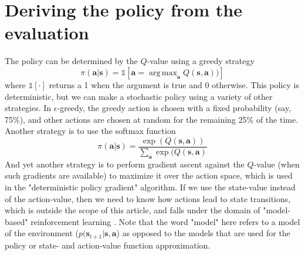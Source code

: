\documentclass{article}
\DeclareMathOperator*{\argmax}{arg\,max}
\begin{document}
\section{Deriving the policy from the evaluation}
The policy can be determined by the $Q$-value using a greedy strategy
\begin{equation}\label{eq:greedy_policy}
    \pi(\mathbf{a}|\mathbf{s})=\mathbb{1}\left[\mathbf{a}=\argmax_\mathbf{a}Q(\mathbf{s},\mathbf{a}))\right]
\end{equation}where $\mathbb{1}[\cdot]$ returns a 1 when the argument is true and 0 otherwise. This policy is deterministic, but we can make a stochastic policy using a variety of other strategies. In $\epsilon$-greedy, the greedy action is chosen with a fixed probability (say, 75\%), and other actions are chosen at random for the remaining 25\% of the time. Another strategy is to use the softmax function
\begin{equation}
  \pi(\mathbf{a}|\mathbf{s})=\frac{\exp(Q(\mathbf{s},\mathbf{a}))}{\sum_\mathbf{a}\exp(Q(\mathbf{s},\mathbf{a})}
\end{equation}And yet another strategy is to perform gradient ascent against the $Q$-value (when such gradients are available) to maximize it over the action space, which is used in the "deterministic policy gradient" algorithm\cite{DDPG}. If we use the state-value instead of the action-value, then we need to know how actions lead to state transitions, which is outside the scope of this article, and falls under the domain of "model-based" reinforcement learning \cite{model_based_rl_survey}. Note that the word "model" here refers to a model of the environment ($p(\mathbf{s}_{t+1}|\mathbf{s},\mathbf{a}$) as opposed to the models that are used for the policy or state- and action-value function approximation.
\end{document}
